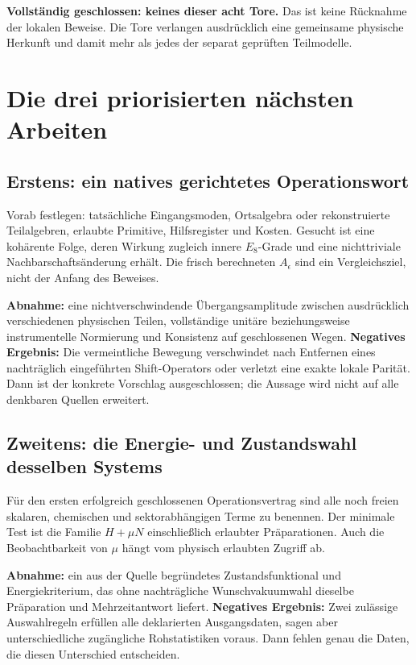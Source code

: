 \textbf{Vollständig geschlossen: keines dieser acht Tore.} Das ist keine Rücknahme der lokalen Beweise. Die Tore verlangen ausdrücklich eine gemeinsame physische Herkunft und damit mehr als jedes der separat geprüften Teilmodelle.

\section{Die drei priorisierten nächsten Arbeiten}
\subsection{Erstens: ein natives gerichtetes Operationswort}
Vorab festlegen: tatsächliche Eingangsmoden, Ortsalgebra oder rekonstruierte Teilalgebren, erlaubte Primitive, Hilfsregister und Kosten. Gesucht ist eine kohärente Folge, deren Wirkung zugleich innere $E_8$-Grade und eine nichttriviale Nachbarschaftsänderung erhält. Die frisch berechneten $A_\epsilon$ sind ein Vergleichsziel, nicht der Anfang des Beweises.

\textbf{Abnahme:} eine nichtverschwindende Übergangsamplitude zwischen ausdrücklich verschiedenen physischen Teilen, vollständige unitäre beziehungsweise instrumentelle Normierung und Konsistenz auf geschlossenen Wegen. \textbf{Negatives Ergebnis:} Die vermeintliche Bewegung verschwindet nach Entfernen eines nachträglich eingeführten Shift-Operators oder verletzt eine exakte lokale Parität. Dann ist der konkrete Vorschlag ausgeschlossen; die Aussage wird nicht auf alle denkbaren Quellen erweitert.

\subsection{Zweitens: die Energie- und Zustandswahl desselben Systems}
Für den ersten erfolgreich geschlossenen Operationsvertrag sind alle noch freien skalaren, chemischen und sektorabhängigen Terme zu benennen. Der minimale Test ist die Familie $H+\mu N$ einschließlich erlaubter Präparationen. Auch die Beobachtbarkeit von $\mu$ hängt vom physisch erlaubten Zugriff ab.

\textbf{Abnahme:} ein aus der Quelle begründetes Zustandsfunktional und Energiekriterium, das ohne nachträgliche Wunschvakuumwahl dieselbe Präparation und Mehrzeitantwort liefert. \textbf{Negatives Ergebnis:} Zwei zulässige Auswahlregeln erfüllen alle deklarierten Ausgangsdaten, sagen aber unterschiedliche zugängliche Rohstatistiken voraus. Dann fehlen genau die Daten, die diesen Unterschied entscheiden.

